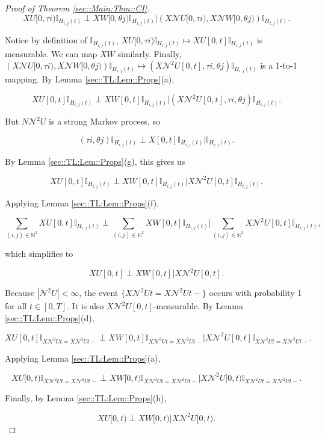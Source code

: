 \documentclass[12pt]{article}
\newcommand{\mb}{\mathbb}
\newcommand{\mc}{\mathcal}
\renewcommand{\U}{U}							%
\newcommand{\UU}{W}								%
\newcommand{\T}{T}								%
\renewcommand{\t}{t}							%
\newcommand{\X}{X}								%
\newcommand{\neigh}{\mc{N}}						%
\newcommand{\dneigh}{\mc{N}^2}					%
\newcommand{\poiss}{N}							%
\newcommand{\rt}{\tau}							%
\newcommand{\rtt}{\theta}						%
\newcommand{\pathseted}[2]{H_{#1,#2}}			%
\begin{document}
\begin{proof}[Proof of Theorem \ref{sec::Main:Thm::CI}]
\[\X{\U}{[0,\rt{i})}\mb{I}_{\pathseted{i}{j}(\t)}\perp\X{\UU}{[0,\rtt{j})}\mb{I}_{\pathseted{i}{j}(\t)}\big|\left(\X{\neigh{\U}}{[0,\rt{i})},\X{\neigh{\UU}}{[0,\rtt{j})}\right)\mb{I}_{\pathseted{i}{j}(\t)}.\]


Notice by definition of \(\mb{I}_{\pathseted{i}{j}(\t)}\), \(\X{\U}{[0,\rt{i})}\mb{I}_{\pathseted{i}{j}(\t)} \mapsto \X{\U}{[0,t]}\mb{I}_{\pathseted{i}{j}(\t)}\) is measurable. We can map \(\X{\UU}{}\) similarly. Finally, \(\left(\X{\neigh{\U}}{[0,\rt{i})},\X{\neigh{\UU}}{[0,\rtt{j})}\right)\mb{I}_{\pathseted{i}{j}(\t)}\mapsto (\X{\dneigh{\U}}{[0,t]}, \rt{i},\rtt{j})\mb{I}_{\pathseted{i}{j}(\t)}\) is a 1-to-1 mapping. By Lemma \ref{sec::TL:Lem::Props}(a),

\[\X{\U}{[0,t]}\mb{I}_{\pathseted{i}{j}(\t)}\perp\X{\UU}{[0,t]}\mb{I}_{\pathseted{i}{j}(\t)}\big|\left(\X{\dneigh{\U}}{[0,t]},\rt{i},\rtt{j}\right)\mb{I}_{\pathseted{i}{j}(\t)}.\]

But \(\poiss{\dneigh{\U}}\) is a strong Markov process, so 

\[(\rt{i},\rtt{j})\mb{I}_{\pathseted{i}{j}(\t)}\perp \X{}{[0,t]}\mb{I}_{\pathseted{i}{j}(\t)}|\mb{I}_{\pathseted{i}{j}(\t)}.\]

By Lemma \ref{sec::TL:Lem::Props}(g), this gives us

\[\X{\U}{[0,t]}\mb{I}_{\pathseted{i}{j}(\t)}\perp\X{\UU}{[0,t]}\mb{I}_{\pathseted{i}{j}(\t)}\big|\X{\dneigh{\U}}{[0,t]}\mb{I}_{\pathseted{i}{j}(\t)}.\]

Applying Lemma \ref{sec::TL:Lem::Props}(f),

\[\sum_{(i,j)\in\mb{N}^2}\X{\U}{[0,t]}\mb{I}_{\pathseted{i}{j}(\t)}\perp\sum_{(i,j)\in\mb{N}^2}\X{\UU}{[0,t]}\mb{I}_{\pathseted{i}{j}(\t)}\bigg|\sum_{(i,j)\in\mb{N}^2}\X{\dneigh{\U}}{[0,t]}\mb{I}_{\pathseted{i}{j}(\t)},\]

which simplifies to 

\[\X{\U}{[0,\t]}\perp\X{\UU}{[0,\t]}\big|\X{\dneigh{\U}}{[0,\t]}.\]

Because \(|\dneigh{\U}| < \infty\), the event \(\{\X{\dneigh{\U}}{\t} = \X{\dneigh{\U}}{\t-}\}\) occurs with probability 1 for all \(\t \in [0,\T]\). It is also \(\X{\dneigh{\U}}{[0,\t]}\)-measurable. By Lemma \ref{sec::TL:Lem::Props}(d),

\[\X{\U}{[0,t]}\mb{I}_{\X{\dneigh{\U}}{\t} = \X{\dneigh{\U}}{\t-}}\perp\X{\UU}{[0,t]}\mb{I}_{\X{\dneigh{\U}}{\t} = \X{\dneigh{\U}}{\t-}}\big|\X{\dneigh{\U}}{[0,t]}\mb{I}_{\X{\dneigh{\U}}{\t} = \X{\dneigh{\U}}{\t-}}.\]

Applying Lemma \ref{sec::TL:Lem::Props}(a),

\[\X{\U}{[0,t)}\mb{I}_{\X{\dneigh{\U}}{\t} = \X{\dneigh{\U}}{\t-}}\perp\X{\UU}{[0,t)}\mb{I}_{\X{\dneigh{\U}}{\t} = \X{\dneigh{\U}}{\t-}}\big|\X{\dneigh{\U}}{[0,t)}\mb{I}_{\X{\dneigh{\U}}{\t} = \X{\dneigh{\U}}{\t-}}.\]

Finally, by Lemma \ref{sec::TL:Lem::Props}(h),

\[\X{\U}{[0,\t)}\perp\X{\UU}{[0,\t)}\big|\X{\dneigh{\U}}{[0,\t)}.\]
\end{proof}
\end{document}

